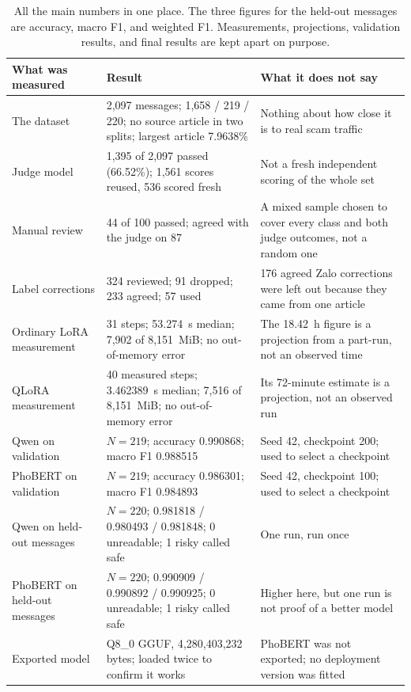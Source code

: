 \begin{table}[H]
\centering
\footnotesize
\renewcommand{\arraystretch}{1.12}
\begin{tabular}{L{3.4cm}L{5.2cm}L{4.7cm}}
\toprule
\textbf{What was measured} & \textbf{Result} & \textbf{What it does not say} \\
\midrule
The dataset & 2{,}097 messages; 1{,}658 / 219 / 220; no source article in two splits; largest article 7.9638\% & Nothing about how close it is to real scam traffic \\
Judge model & 1{,}395 of 2{,}097 passed (66.52\%); 1{,}561 scores reused, 536 scored fresh & Not a fresh independent scoring of the whole set \\
Manual review & 44 of 100 passed; agreed with the judge on 87 & A mixed sample chosen to cover every class and both judge outcomes, not a random one \\
Label corrections & 324 reviewed; 91 dropped; 233 agreed; 57 used & 176 agreed Zalo corrections were left out because they came from one article \\
Ordinary LoRA measurement & 31 steps; 53.274~s median; 7{,}902 of 8{,}151~MiB; no out-of-memory error & The 18.42~h figure is a projection from a part-run, not an observed time \\
QLoRA measurement & 40 measured steps; 3.462389~s median; 7{,}516 of 8{,}151~MiB; no out-of-memory error & Its 72-minute estimate is a projection, not an observed run \\
Qwen on validation & $N=219$; accuracy 0.990868; macro F1 0.988515 & Seed 42, checkpoint 200; used to select a checkpoint \\
PhoBERT on validation & $N=219$; accuracy 0.986301; macro F1 0.984893 & Seed 42, checkpoint 100; used to select a checkpoint \\
Qwen on held-out messages & $N=220$; 0.981818 / 0.980493 / 0.981848; 0 unreadable; 1 risky called safe & One run, run once \\
PhoBERT on held-out messages & $N=220$; 0.990909 / 0.990892 / 0.990925; 0 unreadable; 1 risky called safe & Higher here, but one run is not proof of a better model \\
Exported model & Q8\_0 GGUF, 4{,}280{,}403{,}232 bytes; loaded twice to confirm it works & PhoBERT was not exported; no deployment version was fitted \\
\bottomrule
\end{tabular}
\caption{All the main numbers in one place. The three figures for the held-out messages are accuracy, macro F1, and weighted F1. Measurements, projections, validation results, and final results are kept apart on purpose.}
\label{tab:evaluation-snapshot}
\end{table}
